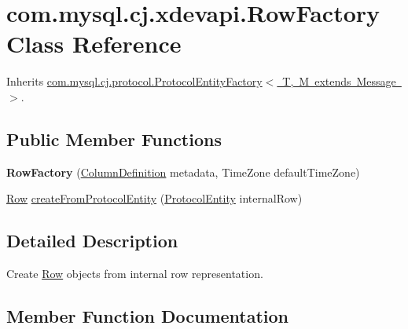 \hypertarget{classcom_1_1mysql_1_1cj_1_1xdevapi_1_1_row_factory}{}\section{com.\+mysql.\+cj.\+xdevapi.\+Row\+Factory Class Reference}
\label{classcom_1_1mysql_1_1cj_1_1xdevapi_1_1_row_factory}


Inherits \mbox{\hyperlink{interfacecom_1_1mysql_1_1cj_1_1protocol_1_1_protocol_entity_factory}{com.\+mysql.\+cj.\+protocol.\+Protocol\+Entity\+Factory$<$ T, M extends Message $>$}}.

\subsection*{Public Member Functions}
\begin{DoxyCompactItemize}
\item 
\mbox{\label{classcom_1_1mysql_1_1cj_1_1xdevapi_1_1_row_factory_ab7f6ec55cd2bfd1989eebc0ee9ef3b4f}} 
{\bfseries Row\+Factory} (\mbox{\hyperlink{interfacecom_1_1mysql_1_1cj_1_1protocol_1_1_column_definition}{Column\+Definition}} metadata, Time\+Zone default\+Time\+Zone)
\item 
\mbox{\hyperlink{interfacecom_1_1mysql_1_1cj_1_1result_1_1_row}{Row}} \mbox{\hyperlink{classcom_1_1mysql_1_1cj_1_1xdevapi_1_1_row_factory_a4320a0bcea400bcd2324daf031ee752f}{create\+From\+Protocol\+Entity}} (\mbox{\hyperlink{interfacecom_1_1mysql_1_1cj_1_1protocol_1_1_protocol_entity}{Protocol\+Entity}} internal\+Row)
\end{DoxyCompactItemize}


\subsection{Detailed Description}
Create \mbox{\hyperlink{interfacecom_1_1mysql_1_1cj_1_1xdevapi_1_1_row}{Row}} objects from internal row representation. 

\subsection{Member Function Documentation}
\mbox{\label{classcom_1_1mysql_1_1cj_1_1xdevapi_1_1_row_factory_a4320a0bcea400bcd2324daf031ee752f}} 
